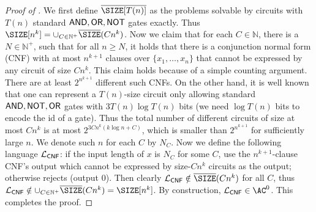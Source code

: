 \begin{proof}[Proof of ]
	We first define $\overline\SIZE[T(n)]$ as the problems solvable by circuits with  $T(n)$ standard $\mathsf{AND},\mathsf{OR},\mathsf{NOT}$ gates exactly. Thus $\SIZE[n^k] = \cup_{C\in\mathbb{N}^+} \overline{\SIZE}(Cn^k)$. Now we claim that for each $C\in\mathbb{N}$, there is a $N\in\mathbb{N}^+$, such that for all $n\ge N$, it holds that there is a conjunction normal form (CNF) with at most $n^{k+1}$ clauses over $\{x_1,\ldots,x_n\}$ that cannot be expressed by any circuit of size $Cn^k$. This claim holds because of a simple counting argument. There are at least $2^{n^{k+1}}$ different such CNFs. On the other hand, it is well known that one can represent a $T(n)$-size circuit only allowing standard $\mathsf{AND},\mathsf{NOT},\mathsf{OR}$ gates with $3T(n)\log T(n)$ bits (we need $\log T(n)$ bits to encode the id of a gate). Thus the total number of different circuits of size at most $Cn^k$ is at most $2^{3C n^k (k\log n+C)}$, which is smaller than $2^{n^{k+1}}$ for sufficiently large $n$. We denote such $n$ for each $C$ by $N_C$. Now we define the following language ${\mathcal{L}}_{\mathsf{CNF}}$: if the input length of $x$ is $N_C$ for some $C$, use the $n^{k+1}$-clause CNF's output which cannot be expressed by size-$Cn^k$ circuits as the output; otherwise rejects (output $0$). Then clearly $\gL_{\mathsf{CNF}}\notin \overline{\SIZE}(Cn^k)$ for all $C$, thus $\gL_{\mathsf{CNF}}\notin \cup_{C\in\mathbb{N}^+} \overline{\SIZE}(Cn^k) = \SIZE[n^k]$. By construction, $\gL_{\mathsf{CNF}}\in \AC^0$. This completes the proof.
\end{proof}


%
%

